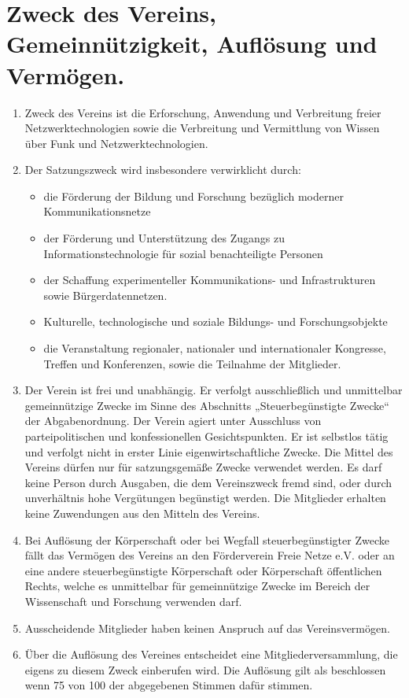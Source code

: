 \documentclass[12pt,a4paper,titlepage]{scrartcl}
\begin{document}
\section{Zweck des Vereins, Gemeinnützigkeit, Auflösung und Vermögen.}
\begin{enumerate}
\item Zweck des Vereins ist die Erforschung, Anwendung und Verbreitung freier 
Netzwerktechnologien sowie die Verbreitung und Vermittlung von Wissen über Funk und 
Netzwerktechnologien. 
\item Der Satzungszweck wird insbesondere verwirklicht durch:
\begin{itemize}
\item die Förderung der Bildung und Forschung bezüglich moderner Kommunikationsnetze
\item der Förderung und Unterstützung des Zugangs zu Informationstechnologie für sozial benachteiligte Personen 
\item  der Schaffung experimenteller Kommunikations- und Infrastrukturen sowie 
Bürgerdatennetzen. 
\item Kulturelle, technologische und soziale Bildungs- und Forschungsobjekte 
\item die Veranstaltung regionaler, nationaler und internationaler Kongresse, Treffen 
und Konferenzen, sowie die Teilnahme der Mitglieder. 
\end{itemize}
\item Der Verein ist frei und unabhängig. Er verfolgt ausschließlich und unmittelbar 
gemeinnützige Zwecke im Sinne des Abschnitts „Steuerbegünstigte Zwecke“ der 
Abgabenordnung. Der Verein agiert unter Ausschluss von parteipolitischen und konfessionellen Gesichtspunkten. Er ist selbstlos tätig und verfolgt nicht in erster Linie eigenwirtschaftliche Zwecke. Die Mittel des Vereins dürfen nur für satzungsgemäße 
Zwecke verwendet werden. Es darf keine Person durch Ausgaben, die dem 
Vereinszweck fremd sind, oder durch unverhältnis hohe Vergütungen begünstigt 
werden. Die Mitglieder erhalten keine Zuwendungen aus den Mitteln des Vereins. 
\item Bei Auflösung der Körperschaft oder bei Wegfall steuerbegünstigter Zwecke fällt das 
Vermögen des Vereins an den Förderverein Freie Netze e.V. oder an eine andere steuerbegünstigte 
Körperschaft oder Körperschaft öffentlichen Rechts, welche es unmittelbar für 
gemeinnützige Zwecke im Bereich der Wissenschaft und Forschung verwenden darf. 
\item Ausscheidende Mitglieder haben keinen Anspruch auf das Vereinsvermögen. 
\item Über die Auflösung des Vereines entscheidet eine Mitgliederversammlung, die eigens 
zu diesem Zweck einberufen wird. Die Auflösung gilt als beschlossen wenn 75 von 100 
der abgegebenen Stimmen dafür stimmen.
\end{enumerate}
\end{document}

